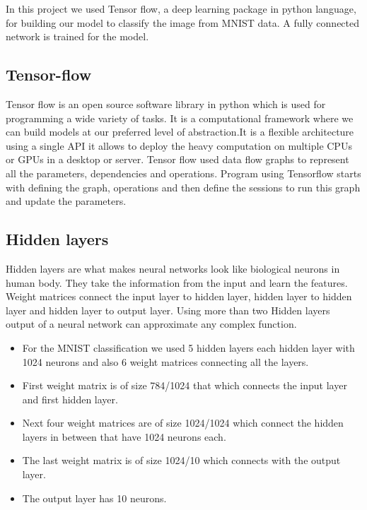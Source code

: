 In this project we used Tensor flow, a deep learning package in python
language, for building our model to classify the image from MNIST data. A
fully connected network is trained for the model.

\subsection{Tensor-flow}

Tensor flow is an open source software library in python which is used for
programming a wide variety of tasks. It is a computational framework where we
can build models at our preferred level of abstraction.It is a flexible
architecture using a single API it allows to deploy the heavy computation on
multiple CPUs or GPUs in a desktop or server. Tensor flow used data flow graphs
to represent all the parameters, dependencies and operations. Program using
Tensorflow starts with defining the graph, operations and then define the
sessions to run this graph and update the parameters. 



\subsection{Hidden layers} 

Hidden layers are what makes neural networks look like biological neurons in
human body. They take the information from the input and learn the features.
Weight matrices connect the input layer to hidden layer, hidden layer to hidden
layer and hidden layer to output layer. Using more than two Hidden layers output
of a neural network can approximate any complex function. 

\begin{itemize}

  \item For the MNIST classification we used 5 hidden layers each hidden layer
  with 1024 neurons and also 6 weight matrices connecting all the layers.

  \item First weight matrix is of size 784/1024 that which connects the input
  layer and first hidden layer.

  \item Next four weight matrices are of size 1024/1024 which connect the
  hidden layers in between that have 1024 neurons each.

  \item The last weight matrix is of size 1024/10 which connects with the
  output layer.

  \item The output layer has 10 neurons. 

\end{itemize}

